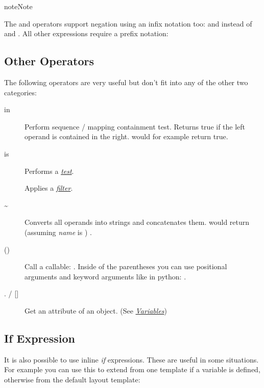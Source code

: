 \documentclass[a4paper,10pt,english]{sphinxmanual}
\begin{document}
\begin{notice}{note}{Note}

The  and  operators support negation using an infix notation
too:  and  instead of 
and .  All other expressions require a prefix notation:
\end{notice}


\subsection{Other Operators}
\label{templates:other-operators}
The following operators are very useful but don't fit into any of the other
two categories:
\begin{description}
\item[{in}] \leavevmode
Perform sequence / mapping containment test.  Returns true if the left
operand is contained in the right.  \code{\{\{ 1 in {[}1, 2, 3{]} \}\}} would for
example return true.

\item[{is}] \leavevmode
Performs a {\hyperref[templates:tests]{\emph{test}}}.

\item[{\textbar{}}] \leavevmode
Applies a {\hyperref[templates:filters]{\emph{filter}}}.

\end{description}
\begin{description}
\item[{\textasciitilde{}}] \leavevmode
Converts all operands into strings and concatenates them.
 would return (assuming \emph{name} is
) .

\item[{()}] \leavevmode
Call a callable: .  Inside of the parentheses you
can use positional arguments and keyword arguments like in python:
.

\item[{. / {[}{]}}] \leavevmode
Get an attribute of an object.  (See {\hyperref[templates:variables]{\emph{Variables}}})

\end{description}


\subsection{If Expression}
\label{templates:id10}\label{templates:if-expression}
It is also possible to use inline \emph{if} expressions.  These are useful in some
situations.  For example you can use this to extend from one template if a
variable is defined, otherwise from the default layout template:
\end{document}
